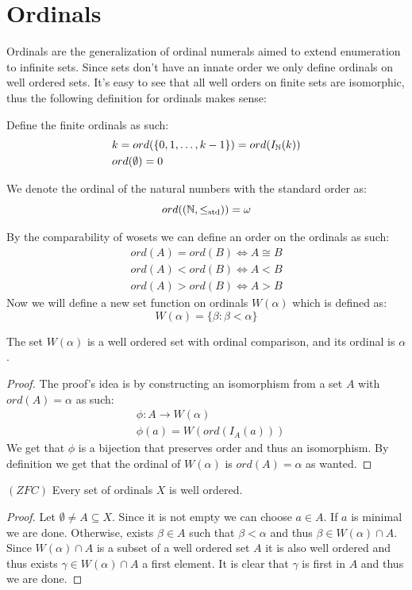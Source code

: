 \documentclass[11pt,a4paper]{article}
\begin{document}
    \newpage
	\section{Ordinals}
		Ordinals are the generalization of ordinal numerals aimed to extend 		
		enumeration to infinite sets. Since sets don't have an innate order
		we only define ordinals on well ordered sets. It's easy to see that
		all well orders on finite sets are isomorphic, thus the following
		definition for ordinals makes sense:
		\begin{definition}
			Define the finite ordinals as such:
			\begin{align*}
				&k = ord(\{0,1,\ldots,k-1\}) = ord(I_{\mathbb{N}}(k)) \\
				&ord(\emptyset) = 0
			\end{align*}
		\end{definition}
	\begin{remark}	
		We denote the ordinal of the natural numbers with the standard order
		as:
		\[
			ord((\mathbb{N},\le_{\mathrm{std}})) = \omega
		\]
	\end{remark}
	By the comparability of wosets we can define an order on the ordinals 
	as such:
	\begin{align*}
		ord(A) = ord(B) \iff A\cong B \\
		ord(A) < ord(B) \iff A < B \\
		ord(A) > ord(B) \iff A > B
	\end{align*}
	\noindent
	Now we will define a new set function on ordinals $W(\alpha)$ which is
	defined as:
	\[
		W(\alpha) = \{\beta \colon \beta < \alpha\}
	\]
	\begin{proposition}
		The set $W(\alpha)$ is a well ordered set with ordinal comparison,
		and its ordinal is $\alpha$.
	\end{proposition}
	\begin{proof}
		The proof's idea is by constructing an isomorphism from a set $A$ 
		with $ord(A)=\alpha$ as such:
		\begin{align*}
			&\phi \colon A \rightarrow W(\alpha) \\
			&\phi(a) = W(ord(I_A(a)))	
		\end{align*}
		We get that $\phi$ is a bijection that preserves order and thus an
		isomorphism. By definition we get that the ordinal of $W(\alpha)$
		is $ord(A) = \alpha$ as wanted.
	\end{proof}

	\begin{proposition}
		$(ZFC)$ Every set of ordinals $X$ is well ordered.
	\end{proposition}
	\begin{proof}
	Let $\emptyset \neq A \subseteq X$. Since it is not empty we can choose
	$a \in A$. If $a$ is minimal we are done. Otherwise, exists $\beta \in A$
	such that $\beta < \alpha$ and thus $\beta \in W(\alpha) \cap A$. Since
	$W(\alpha) \cap A$ is a subset of a well ordered set $A$ it is also well
	ordered and thus exists $\gamma \in W(\alpha) \cap A$ a first element.
	It is clear that $\gamma$ is first in $A$ and thus we are done.
	\end{proof}
	
\end{document}

